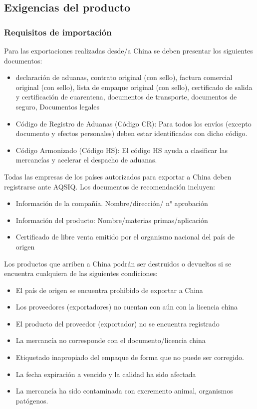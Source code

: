 \documentclass[
  stu,
  floatsintext,
  longtable,
  a4paper,
  nolmodern,
  notxfonts,
  notimes,
  colorlinks=true,linkcolor=blue,citecolor=blue,urlcolor=blue]{apa7}
\begin{document}
\subsection{Exigencias del producto}\label{exigencias-del-producto}

\subsubsection{Requisitos de
importación}\label{requisitos-de-importaciuxf3n}

Para las exportaciones realizadas desde/a China se deben presentar los
siguientes documentos:

\begin{itemize}
\item
  declaración de aduanas, contrato original (con sello), factura
  comercial original (con sello), lista de empaque original (con sello),
  certificado de salida y certificación de cuarentena, documentos de
  transporte, documentos de seguro, Documentos legales
\item
  Código de Registro de Aduanas (Código CR): Para todos los envíos
  (excepto documento y efectos personales) deben estar identificados con
  dicho código.
\item
  Código Armonizado (Código HS): El código HS ayuda a clasificar las
  mercancías y acelerar el despacho de aduanas.
\end{itemize}

Todas las empresas de los países autorizados para exportar a China deben
registrarse ante AQSIQ. Los documentos de recomendación incluyen:

\begin{itemize}
\item
  Información de la compañía. Nombre/dirección/ n° aprobación
\item
  Información del producto: Nombre/materias primas/aplicación
\item
  Certificado de libre venta emitido por el organismo nacional del país
  de origen
\end{itemize}

Los productos que arriben a China podrán ser destruidos o devueltos si
se encuentra cualquiera de las siguientes condiciones:

\begin{itemize}
\item
  El país de origen se encuentra prohibido de exportar a China
\item
  Los proveedores (exportadores) no cuentan con aún con la licencia
  china
\item
  El producto del proveedor (exportador) no se encuentra registrado
\item
  La mercancía no corresponde con el documento/licencia china
\item
  Etiquetado inapropiado del empaque de forma que no puede ser
  corregido.
\item
  La fecha expiración a vencido y la calidad ha sido afectada
\item
  La mercancía ha sido contaminada con excremento animal, organismos
  patógenos.
\end{itemize}
\end{document}
